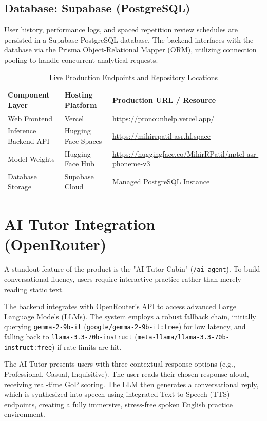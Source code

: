 \subsection{Database: Supabase (PostgreSQL)}
User history, performance logs, and spaced repetition review schedules are persisted in a Supabase PostgreSQL database. The backend interfaces with the database via the Prisma Object-Relational Mapper (ORM), utilizing connection pooling to handle concurrent analytical requests.

\begin{table}[h]
    \centering
    \small
    \caption{Live Production Endpoints and Repository Locations}
    \label{tab:deployed_links}
    \begin{tabular}{p{4.2cm} p{3.8cm} p{6.5cm}}
        \toprule
        \textbf{Component Layer} & \textbf{Hosting Platform} & \textbf{Production URL / Resource} \\
        \midrule
        Web Frontend & Vercel & \url{https://pronounhelp.vercel.app/} \\
        Inference Backend API & Hugging Face Spaces & \url{https://mihirrpatil-asr.hf.space} \\
        Model Weights & Hugging Face Hub & \url{https://huggingface.co/MihirRPatil/nptel-asr-phoneme-v3} \\
        Database Storage & Supabase Cloud & Managed PostgreSQL Instance \\
        \bottomrule
    \end{tabular}
\end{table}

\section{AI Tutor Integration (OpenRouter)}
A standout feature of the product is the "AI Tutor Cabin" (\texttt{/ai-agent}). To build conversational fluency, users require interactive practice rather than merely reading static text. 

The backend integrates with OpenRouter's API to access advanced Large Language Models (LLMs). The system employs a robust fallback chain, initially querying \texttt{gemma-2-9b-it} (\texttt{google/}\allowbreak\texttt{gemma-2-9b-it:free}) for low latency, and falling back to \texttt{llama-3.3-70b-instruct} (\texttt{meta-llama/}\allowbreak\texttt{llama-3.3-70b-instruct:free}) if rate limits are hit. 

The AI Tutor presents users with three contextual response options (e.g., Professional, Casual, Inquisitive). The user reads their chosen response aloud, receiving real-time GoP scoring. The LLM then generates a conversational reply, which is synthesized into speech using integrated Text-to-Speech (TTS) endpoints, creating a fully immersive, stress-free spoken English practice environment.
